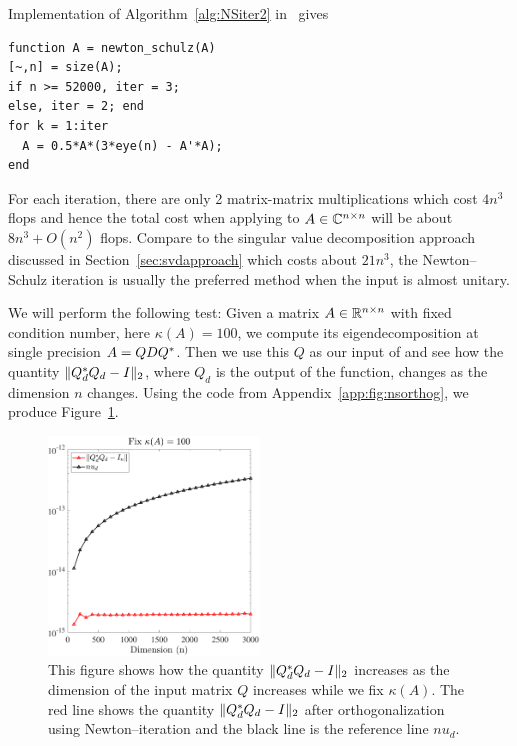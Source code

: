 Implementation of Algorithm~\ref{alg:NSiter2} in \mat~gives 
\begin{lstlisting}
function A = newton_schulz(A)
[~,n] = size(A); 
if n >= 52000, iter = 3;
else, iter = 2; end
for k = 1:iter
  A = 0.5*A*(3*eye(n) - A'*A); 
end
\end{lstlisting}
For each iteration, there are only 2 matrix-matrix multiplications which cost $4n^3$ flops and hence the total cost when applying  to $A\in\mathbb{C}^{n\times n}$ will be about $8n^3 + O(n^2)$ flops. Compare to the singular value decomposition approach discussed in Section~\ref{sec:svdapproach} which costs about $21n^3$, the Newton--Schulz iteration is usually the preferred method when the input is almost unitary.

We will perform the following test: Given a matrix $A\in\mathbb{R}^{n\times n}$ with fixed condition number, here $\kappa(A) = 100$, we compute its eigendecomposition at single precision $A = QDQ^*$. Then we use this $Q$ as our input of  and see how the quantity $\norm{Q_d\ctp Q_d - I}$, where $Q_d$ is the output of the function, changes as the dimension $n$ changes. Using the code from Appendix~\ref{app:fig:nsorthog}, we produce Figure~\ref{fig:nsorthog}.

\begin{figure}[ht]
\centering
\includegraphics[width=0.5\textwidth]{figs/how_good_ns.pdf}
\caption[Behavior of $\norm{Q_d\ctp Q_d - I}$ with the dimension of the input $Q$ increases and $\kappa(A)$ fixes using the Newton--Schulz iteration.]{This figure shows how the quantity $\norm{Q_d\ctp Q_d - I}$ increases as the dimension of the input matrix $Q$ increases while we fix $\kappa(A)$. The red line shows the quantity $\norm{Q_d\ctp Q_d - I}$ after orthogonalization using Newton--iteration and the black line is the reference line $nu_d$.}
\label{fig:nsorthog}
\end{figure}

